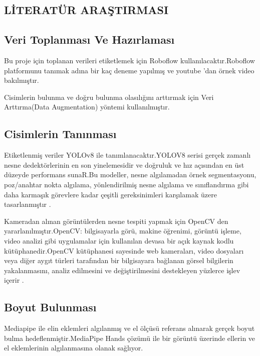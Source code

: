 \documentclass[11pt,a4paper]{report}
\begin{document}
 
   \begin{justify}
   \section{LİTERATÜR ARAŞTIRMASI}
    \raggedright
   	\subsection{Veri Toplanması Ve Hazırlaması}
   	
   Bu proje için toplanan verileri etiketlemek için Roboflow kullanılacaktır.Roboflow platformunu tanımak adına bir kaç deneme yapılmış ve youtube 'dan örnek video bakılmıştır\cite{roboflowvideo}.
   \newline
   
   Cisimlerin bulunma ve doğru bulunma olasılığını arttırmak için Veri Arttırma(Data Augmentation) yöntemi kullanılmıştır\cite{Augmentation1}.
   
   \subsection{Cisimlerin Tanınması}
   Etiketlenmiş veriler YOLOv8 ile tanımlanacaktır.YOLOV8 serisi gerçek zamanlı nesne dedektörlerinin en son yinelemesidir ve doğruluk ve hız açısından en üst düzeyde performans sunaR.Bu modeller, nesne algılamadan örnek segmentasyonu, poz/anahtar nokta algılama, yönlendirilmiş nesne algılama ve sınıflandırma gibi daha karmaşık görevlere kadar çeşitli gereksinimleri karşılamak üzere tasarlanmıştır \cite{yolov8}.\newline
   
   Kameradan alınan görüntülerden nesne tespiti yapmak için OpenCV den yararlanılmıştır.OpenCV: bilgisayarla görü, makine öğrenimi, görüntü işleme, video analizi gibi uygulamalar için kullanılan devasa bir açık kaynak kodlu kütüphanedir.OpenCV kütüphanesi sayesinde web kameraları, video dosyaları veya diğer aygıt türleri tarafından bir bilgisayara bağlanan görsel bilgilerin yakalanmasını, analiz edilmesini ve değiştirilmesini destekleyen yüzlerce işlev içerir \cite{OPENCV}. \newline
   
   \subsection{Boyut Bulunması}
   Mediapipe ile elin eklemleri algılanmış ve el ölçüsü referans alınarak gerçek boyut bulma hedeflenmiştir.MediaPipe Hands çözümü ile bir görüntü üzerinde ellerin ve el eklemlerinin algılanmasına olanak sağlıyor.\newline
   
   
  \end{justify}
   
\end{document}
